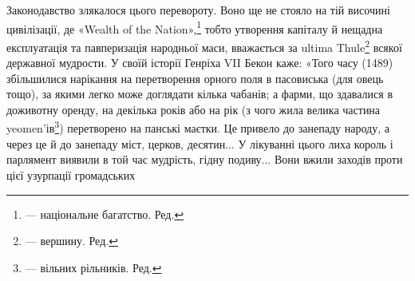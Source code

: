 Законодавство злякалося цього перевороту. Воно ще не
стояло на тій височині цивілізації, де «Wealth of the Nation»,\footnote*{
— національне багатство. Ред.
}
тобто утворення капіталу й нещадна експлуатація та павперизація
народньої маси, вважається за ultima Thule\footnote*{
— вершину. Ред.
} всякої державної
мудрости. У своїй історії Генріха VII Бекон каже: «Того
часу (1489) збільшилися нарікання на перетворення орного поля
в пасовиська (для овець тощо), за якими легко може доглядати
кілька чабанів; а фарми, що здавалися в доживотну оренду, на декілька
років або на рік (з чого жила велика частина yeomen’ів\footnote*{
— вільних рільників. Ред.
})
перетворено на панські маєтки. Це привело до занепаду народу,
а через це й до занепаду міст, церков, десятин... У лікуванні
цього лиха король і парлямент виявили в той час мудрість, гідну
подиву... Вони вжили заходів проти цієї узурпації громадських
\parbreak{}  %
